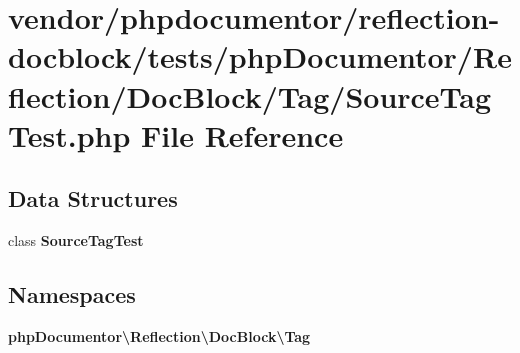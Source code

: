 \section{vendor/phpdocumentor/reflection-\/docblock/tests/php\+Documentor/\+Reflection/\+Doc\+Block/\+Tag/\+Source\+Tag\+Test.php File Reference}
\label{_source_tag_test_8php}
\subsection*{Data Structures}
\begin{DoxyCompactItemize}
\item 
class {\bf Source\+Tag\+Test}
\end{DoxyCompactItemize}
\subsection*{Namespaces}
\begin{DoxyCompactItemize}
\item 
 {\bf php\+Documentor\textbackslash{}\+Reflection\textbackslash{}\+Doc\+Block\textbackslash{}\+Tag}
\end{DoxyCompactItemize}

